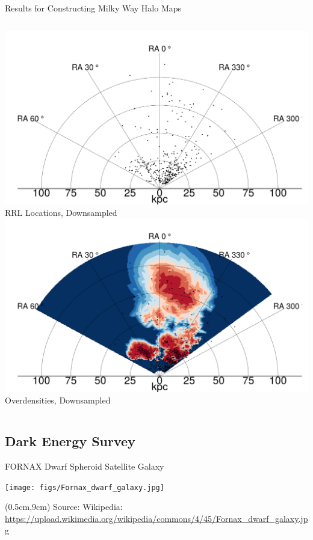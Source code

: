 \documentclass[12pt]{beamer}
\newcommand{\att}[1]{\begin{textblock*}{12cm}(0.5cm,9cm) %
  {\tiny Source: #1}
      \end{textblock*}}
\begin{document}
\begin{frame}{Results for Constructing Milky Way Halo Maps}
\begin{columns}
    \begin{column}{0.5\textwidth}
      \begin{center}
    \includegraphics[scale=\tw]{figs/density_rr_model_sampled_points.png}\\
    RRL Locations, Downsampled\\
    \includegraphics[scale=\tw]{figs/density_rr_model_sampled.png}\\
    Overdensities, Downsampled
    \end{center}
  \end{column}

\end{columns}
\end{frame}




\subsection{Dark Energy Survey}

\begin{frame}{FORNAX Dwarf Spheroid Satellite Galaxy}
  \begin{center}
    \texttt{[image: figs/Fornax\_dwarf\_galaxy.jpg]}
  \end{center}
\att{Wikipedia: \url{https://upload.wikimedia.org/wikipedia/commons/4/45/Fornax_dwarf_galaxy.jpg}}
\end{frame}
\end{document}
